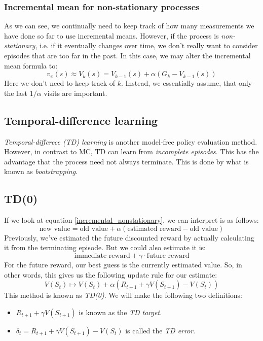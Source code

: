 \documentclass[12pt, a4paper]{article}
\numberwithin{equation}{section}
\begin{document}
\subsubsection{Incremental mean for non-stationary processes}
As we can see, we continually need to keep track of how many measurements we have done so far to use incremental means. However, if the process is \textit{non-stationary}, i.e. if it eventually changes over time, we don't really want to consider episodes that are too far in the past. In this case, we may alter the incremental mean formula to:
\begin{equation}
v_\pi(s)\approx V_k(s)=V_{k-1}(s)+\alpha(G_k-V_{k-1}(s))
\label{incremental_nonstationary}
\end{equation}
Here we don't need to keep track of $k$. Instead, we essentially assume, that only the last $1/\alpha$ visits are important.

\subsection{Temporal-difference learning}
\textit{Temporal-differece (TD) learning} is another model-free policy evaluation method. However, in contrast to MC, TD can learn from \textit{incomplete episodes}. This has the advantage that the process need not always terminate. This is done by what is known as \textit{bootstrapping}.

\subsection{TD(0)}
If we look at equation \ref{incremental_nonstationary}, we can interpret is as follows:
\begin{equation}
\textrm{new value}=\textrm{old value}+\alpha(\textrm{estimated reward}-\textrm{old value})
\end{equation}
Previously, we've estimated the future discounted reward by actually calculating it from the terminating episode. But we could also estimate it is:
\begin{equation}
\textrm{immediate reward}+\gamma\cdot\textrm{future reward}
\end{equation}
For the future reward, our best guess is the currently estimated value. So, in other words, this gives us the following update rule for our estimate:
\begin{equation}
V(S_t)\mapsto V(S_t)+\alpha(R_{t+1}+\gamma V(S_{t+1})-V(S_t)) 
\end{equation}
This method is known as \textit{TD(0)}. We will make the following two definitions:
\begin{itemize}
\item $R_{t+1}+\gamma V(S_{t+1})$ is known as the \textit{TD target}.
\item $\delta_t=R_{t+1}+\gamma V(S_{t+1})-V(S_t)$ is called the \textit{TD error}.
\end{itemize}
\end{document}
